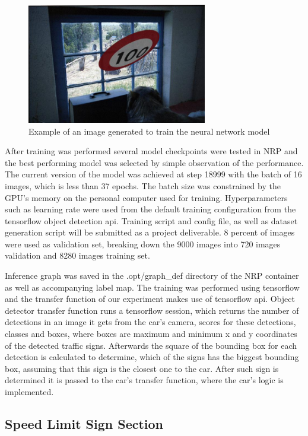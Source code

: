 \begin{figure}
  \centering
  \includegraphics[width=0.7\textwidth]{chapter/images/img-1.jpg}
  \caption{Example of an image generated to train the neural network model}
  \label{fig:img}
\end{figure}


After training was performed several model checkpoints were tested in NRP and the best performing model was selected by simple observation of the performance. The current version of the model was achieved at step 18999 with the batch of 16 images, which is less than 37 epochs. The batch size was constrained by the GPU's memory on the personal computer used for training. Hyperparameters such as learning rate were used from the default training configuration from the tensorflow object detection api. Training script and config file, as well as dataset generation script will be submitted as a project deliverable. 8 percent of images were used as validation set, breaking down the 9000 images into 720 images validation and 8280 images training set.


Inference graph was saved in the .opt/graph\_def directory of the NRP container as well as accompanying label map. The training was performed using tensorflow and the transfer function of our experiment makes use of tensorflow api. Object detector transfer function runs a tensorflow session, which returns the number of detections in an image it gets from the car's camera, scores for these detections, classes and boxes, where boxes are maximum and minimum x and y coordinates of the detected traffic signs. Afterwards the square of the bounding box for each detection is calculated to determine, which of the signs has the biggest bounding box, assuming that this sign is the closest one to the car. After such sign is determined it is passed to the car's transfer function, where the car's logic is implemented. 

\subsection{Speed Limit Sign Section}

